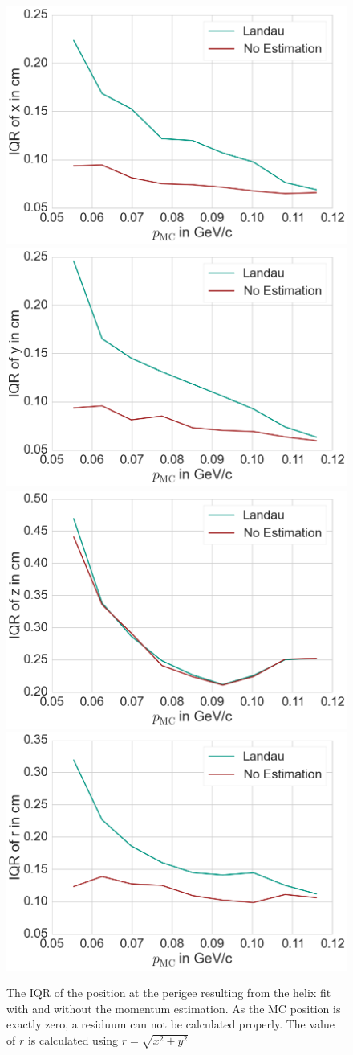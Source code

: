 \begin{figure}
  \centering
  \includegraphics[width=0.48\linewidth]{figures/vxd/perigee_x.png}
  \includegraphics[width=0.48\linewidth]{figures/vxd/perigee_y.png}
  \includegraphics[width=0.48\linewidth]{figures/vxd/perigee_z.png}
  \includegraphics[width=0.48\linewidth]{figures/vxd/perigee_r.png}
  \caption[Perigee position with and without the momentum estimation.]{The IQR of the position at the perigee resulting from the helix fit with and without the momentum estimation. As the MC position is exactly zero, a residuum can not be calculated properly. The value of $r$ is calculated using $r=\sqrt{x^2 + y^2}$}
  \label{fig-position}
\end{figure}

